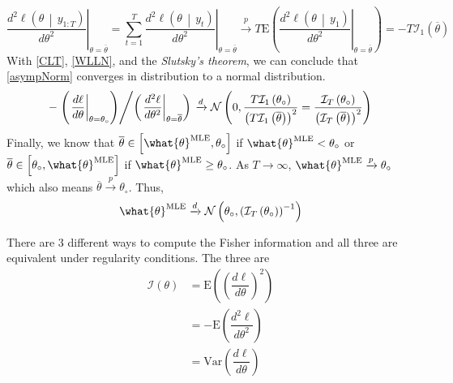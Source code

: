 \documentclass[answers]{exam}
\begin{document}
\begin{questions}
\begin{solution}
\begin{enumerate}[a)]
\begin{itemize}
      \begin{equation}\label{WLLN}
        \left.\dfrac{d^{2}\ell\left(\theta\,\middle|\,y_{1:T}\right)}{d\theta^{2}}\right|_{\theta=\overline{\theta}}=\sum_{t=1}^{T}\left.\dfrac{d^{2}\ell\left(\theta\,\middle|\,y_{t}\right)}{d\theta^{2}}\right|_{\theta=\overline{\theta}} \xrightarrow{p} T\mathrm{E}\left(\left.\dfrac{d^{2}\ell\left(\theta\,\middle|\,y_{1}\right)}{d\theta^{2}}\right|_{\theta=\overline{\theta}} \right) =-T\mathcal{I}_{1}\left(\overline{\theta}\right)
      \end{equation}
      With \ref{CLT}, \ref{WLLN}, and the \emph{Slutsky's theorem}, we can conclude that \ref{asympNorm} converges in distribution to a normal distribution.
      \begin{equation}
        -\left.\left(\left.\dfrac{d\ell}{d\theta}\right|_{\theta=\theta_{\circ}}\right)\middle/\left(\left.\dfrac{d^{2}\ell}{d\theta^{2}}\right|_{\theta=\overline{\theta}}\right)\right. \xrightarrow{d} \mathcal{N}\left(0,\dfrac{T\mathcal{I}_{1}\left(\theta_{\circ}\right)}{\left(T\mathcal{I}_{1}\left(\overline{\theta}\right)\right)^{2}}=\dfrac{\mathcal{I}_{T}\left(\theta_{\circ}\right)}{\left(\mathcal{I}_{T}\left(\overline{\theta}\right)\right)^{2}}\right)
      \end{equation}
      Finally, we know that $\overline{\theta}\in \left[\what{\theta}^{\text{MLE}},\theta_{\circ}\right]$ if $\what{\theta}^{\text{MLE}} < \theta_{\circ}$ or $\overline{\theta}\in \left[\theta_{\circ},\what{\theta}^{\text{MLE}}\right]$ if $\what{\theta}^{\text{MLE}} \geq \theta_{\circ}$. As $T\to\infty$, $\what{\theta}^{\text{MLE}}\xrightarrow{p}\theta_{\circ}$ which also means $\overline{\theta}\xrightarrow{p}\theta_{\circ}$. Thus,
      \begin{equation}
        \what{\theta}^{\text{MLE}} \xrightarrow{d} \mathcal{N}\left(\theta_{\circ},\left(\mathcal{I}_{T}\left(\theta_{\circ}\right)\right)^{-1}\right)
      \end{equation}
      \end{itemize}
    \end{enumerate}
    There are 3 different ways to compute the Fisher information and all three are equivalent under regularity conditions. The three are
    \begin{align}
      \mathcal{I}\left(\theta\right) &= \mathrm{E}\left(\left(\dfrac{d\ell}{d\theta}\right)^{2}\right)\\
      &= -\mathrm{E}\left(\dfrac{d^{2}\ell}{d\theta^{2}}\right)\\
      &= \mathrm{Var}\left(\dfrac{d\ell}{d\theta}\right)
    \end{align}
  \end{solution}
  \end{questions}
  \appendix
\end{document}
